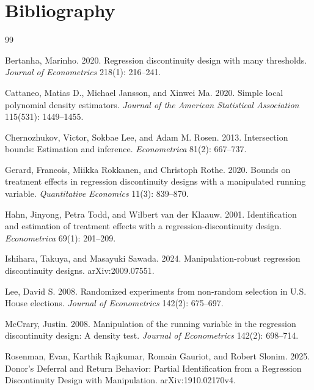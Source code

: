 \documentclass[11pt]{article}
\theoremstyle{definition}
\theoremstyle{plain}
\theoremstyle{remark}
\begin{document}
\section*{Bibliography}
\begin{thebibliography}{99}

Bertanha, Marinho.
2020.
Regression discontinuity design with many thresholds.
\emph{Journal of Econometrics} 218(1): 216--241.

Cattaneo, Matias D., Michael Jansson, and Xinwei Ma.
2020.
Simple local polynomial density estimators.
\emph{Journal of the American Statistical Association} 115(531): 1449--1455.

Chernozhukov, Victor, Sokbae Lee, and Adam M. Rosen.
2013.
Intersection bounds: Estimation and inference.
\emph{Econometrica} 81(2): 667--737.

Gerard, Francois, Miikka Rokkanen, and Christoph Rothe.
2020.
Bounds on treatment effects in regression discontinuity designs with a manipulated running variable.
\emph{Quantitative Economics} 11(3): 839--870.

Hahn, Jinyong, Petra Todd, and Wilbert van der Klaauw.
2001.
Identification and estimation of treatment effects with a regression-discontinuity design.
\emph{Econometrica} 69(1): 201--209.

Ishihara, Takuya, and Masayuki Sawada.
2024.
Manipulation-robust regression discontinuity designs.
arXiv:2009.07551.

Lee, David S.
2008.
Randomized experiments from non-random selection in U.S. House elections.
\emph{Journal of Econometrics} 142(2): 675--697.

McCrary, Justin.
2008.
Manipulation of the running variable in the regression discontinuity design: A density test.
\emph{Journal of Econometrics} 142(2): 698--714.

Rosenman, Evan, Karthik Rajkumar, Romain Gauriot, and Robert Slonim.
2025.
Donor's Deferral and Return Behavior: Partial Identification from a Regression Discontinuity Design with Manipulation.
arXiv:1910.02170v4.

\end{thebibliography}
\end{document}
